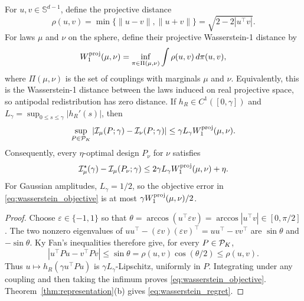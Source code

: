 \begin{proposition}
\label{prop:wasserstein}
For $u,v\in\mathbb S^{d-1}$, define the projective distance
\begin{equation}
\rho(u,v)=\min\{\|u-v\|,\|u+v\|\}
=\sqrt{2-2|u^{\top}v|}.
\label{eq:projective_distance}
\end{equation}
For laws $\mu$ and $\nu$ on the sphere, define their projective
Wasserstein-1 distance by
\begin{equation}
W_1^{\rm proj}(\mu,\nu)=\inf_{\pi\in\Pi(\mu,\nu)}
\int\rho(u,v)\,d\pi(u,v),
\label{eq:wasserstein_definition}
\end{equation}
where $\Pi(\mu,\nu)$ is the set of couplings with marginals $\mu$ and $\nu$.
Equivalently, this is the Wasserstein-1 distance between the laws induced on
real projective space, so antipodal redistribution has zero distance.
If $h_R\in C^1([0,\gamma])$ and
$L_\gamma=\sup_{0\le s\le\gamma}|h_R'(s)|$, then
\begin{equation}
\sup_{P\in\mathcal P_K}|\mathcal I_\mu(P;\gamma)-\mathcal I_\nu(P;\gamma)|
\le \gamma L_\gamma W_1^{\rm proj}(\mu,\nu).
\label{eq:wasserstein_objective}
\end{equation}
Consequently, every $\eta$-optimal design $P_\nu$ for $\nu$ satisfies
\begin{equation}
\mathcal I_\mu^\star(\gamma)-\mathcal I_\mu(P_\nu;\gamma)
\le2\gamma L_\gamma W_1^{\rm proj}(\mu,\nu)+\eta.
\label{eq:wasserstein_regret}
\end{equation}
For Gaussian amplitudes, $L_\gamma=1/2$, so the objective error in
\eqref{eq:wasserstein_objective} is at most
$\gamma W_1^{\rm proj}(\mu,\nu)/2$.
\end{proposition}
\begin{proof}
Choose $\varepsilon\in\{-1,1\}$ so that
$\theta=\arccos(u^{\top}\varepsilon v)=\arccos|u^{\top}v|\in[0,\pi/2]$.
The two nonzero eigenvalues of
$uu^{\top}-(\varepsilon v)(\varepsilon v)^{\top}=uu^{\top}-vv^{\top}$ are
$\sin\theta$ and $-\sin\theta$. Ky Fan's inequalities therefore give, for
every $P\in\mathcal P_K$,
\begin{equation}
|u^{\top}Pu-v^{\top}Pv|
\le\sin\theta
=\rho(u,v)\cos(\theta/2)
\le\rho(u,v).
\end{equation}
Thus $u\mapsto h_R(\gamma u^{\top}Pu)$ is
$\gamma L_\gamma$-Lipschitz, uniformly in $P$. Integrating under any
coupling and then taking the infimum proves \eqref{eq:wasserstein_objective}.
Theorem~\ref{thm:representation}(b) gives \eqref{eq:wasserstein_regret}.
\end{proof}

